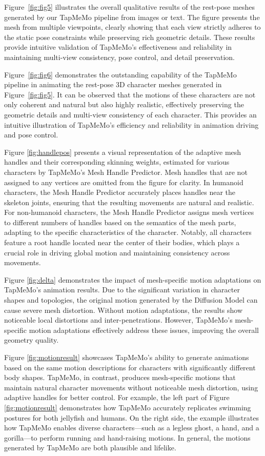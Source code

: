 \documentclass[lettersize,journal]{IEEEtran}
\begin{document}
Figure~\ref{fig:fig5} illustrates the overall qualitative results of the rest-pose meshes generated by our TapMeMo pipeline from images or text. The figure presents the mesh from multiple viewpoints, clearly showing that each view strictly adheres to the static pose constraints while preserving rich geometric details. These results provide intuitive validation of TapMeMo’s effectiveness and reliability in maintaining multi-view consistency, pose control, and detail preservation.

Figure~\ref{fig:fig6} demonstrates the outstanding capability of the TapMeMo pipeline in animating the rest-pose 3D character meshes generated in Figure~\ref{fig:fig5}. It can be observed that the motions of these characters are not only coherent and natural but also highly realistic, effectively preserving the geometric details and multi-view consistency of each character. This provides an intuitive illustration of TapMeMo’s efficiency and reliability in animation driving and pose control.

Figure \ref{fig:handlepos} presents a visual representation of the adaptive mesh handles and their corresponding skinning weights, estimated for various characters by TapMeMo's Mesh Handle Predictor. Mesh handles that are not assigned to any vertices are omitted from the figure for clarity. In humanoid characters, the Mesh Handle Predictor accurately places handles near the skeleton joints, ensuring that the resulting movements are natural and realistic. For non-humanoid characters, the Mesh Handle Predictor assigns mesh vertices to different numbers of handles based on the semantics of the mesh parts, adapting to the specific characteristics of the character. Notably, all characters feature a root handle located near the center of their bodies, which plays a crucial role in driving global motion and maintaining consistency across movements.

Figure \ref{fig:delta} demonstrates the impact of mesh-specific motion adaptations on TapMeMo's animation results. Due to the significant variation in character shapes and topologies, the original motion generated by the Diffusion Model can cause severe mesh distortion. Without motion adaptations, the results show noticeable local distortions and inter-penetrations. However, TapMeMo’s mesh-specific motion adaptations effectively address these issues, improving the overall geometry quality.

Figure \ref{fig:motionresult} showcases TapMeMo's ability to generate animations based on the same motion descriptions for characters with significantly different body shapes. TapMeMo, in contrast, produces mesh-specific motions that maintain natural character movements without noticeable mesh distortion, using adaptive handles for better control. For example, the left part of Figure \ref{fig:motionresult} demonstrates how TapMeMo accurately replicates swimming postures for both jellyfish and humans. On the right side, the example illustrates how TapMeMo enables diverse characters—such as a legless ghost, a hand, and a gorilla—to perform running and hand-raising motions. In general, the motions generated by TapMeMo are both plausible and lifelike.
\end{document}
